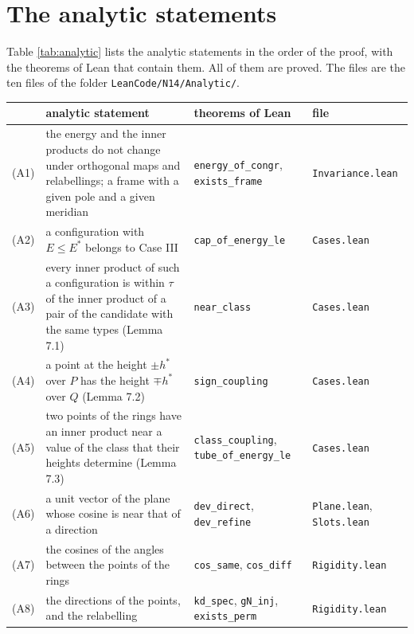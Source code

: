 \documentclass[reqno,a4paper,11pt]{amsart}
\newcommand{\lean}[1]{\texttt{#1}}
\newcommand{\file}[1]{\nolinkurl{#1}}
\begin{document}
\section{The analytic statements}

Table \ref{tab:analytic} lists the analytic statements in the order of the proof, with the theorems of Lean that contain them. All of them are proved. The files are the ten files of the folder \file{LeanCode/N14/Analytic/}.

\begin{table}[ht]
\centering
\small
\begin{tabular}{@{}lp{}p{}p{}@{}}
\toprule
 & analytic statement & theorems of Lean & file \\
\midrule
(A1) & the energy and the inner products do not change under orthogonal maps and relabellings; a frame with a given pole and a given meridian & \lean{energy\_of\_congr}, \newline \lean{exists\_frame} & \file{Invariance.lean} \\
(A2) & a configuration with $E \leq E^*$ belongs to Case III & \lean{cap\_of\_energy\_le} & \file{Cases.lean} \\
(A3) & every inner product of such a configuration is within $\tau$ of the inner product of a pair of the candidate with the same types (Lemma 7.1) & \lean{near\_class} & \file{Cases.lean} \\
(A4) & a point at the height $\pm h^*$ over $P$ has the height $\mp h^*$ over $Q$ (Lemma 7.2) & \lean{sign\_coupling} & \file{Cases.lean} \\
(A5) & two points of the rings have an inner product near a value of the class that their heights determine (Lemma 7.3) & \lean{class\_coupling}, \newline \lean{tube\_of\_energy\_le} & \file{Cases.lean} \\
(A6) & a unit vector of the plane whose cosine is near that of a direction & \lean{dev\_direct}, \newline \lean{dev\_refine} & \file{Plane.lean}, \newline \file{Slots.lean} \\
(A7) & the cosines of the angles between the points of the rings & \lean{cos\_same}, \lean{cos\_diff} & \file{Rigidity.lean} \\
(A8) & the directions of the points, and the relabelling & \lean{kd\_spec}, \lean{gN\_inj}, \newline \lean{exists\_perm} & \file{Rigidity.lean} \\

\end{tabular}
\end{table}
\end{document}
